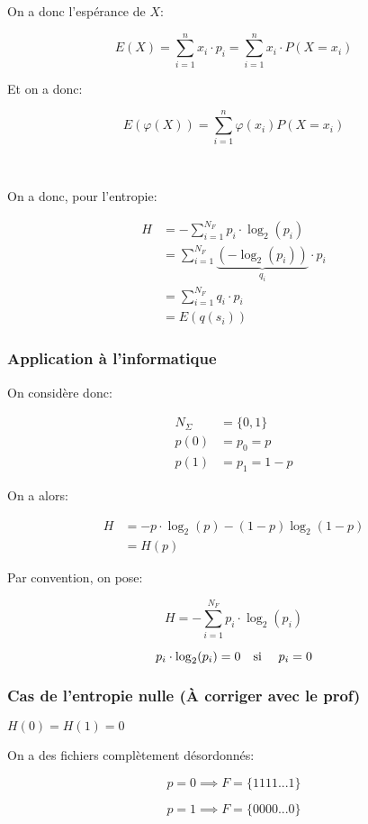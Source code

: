 \documentclass[a4paper,11pt]{article}
\newcommand{\ti}{\cdot}
\begin{document}
On a donc l'espérance de $X$:

$$ E(X) = \sum_{i = 1}^nx_i \ti p_i = \sum_{i = 1}^nx_i \ti P(X = x_i) $$

Et on a donc:

$$ E(\varphi(X)) = \sum_{i = 1}^n \varphi(x_i) P(X = x_i) $$

\

On a donc, pour l'entropie:

\begin{align*}
  H &= - \sum_{i = 1}^{N_F}p_i \ti \log_2(p_i) \\
    &= \sum_{i = 1}^{N_F} \underbrace{(- \log_2(p_i))}_{q_i} \ti p_i \\
    &= \sum_{i = 1}^{N_F} q_i \ti p_i \\
    &= E(q(s_i))
\end{align*}

\subsubsection{Application à l'informatique}

On considère donc:

\begin{align*}
  N_\Sigma &= \{0, 1\} \\
  p(0) &= p_0 = p \\
  p(1) &= p_1 = 1 - p
\end{align*}

On a alors:

\begin{align*}
  H &= -p \ti \log_2(p) - (1 - p) \log_2(1 - p) \\
    &= H(p)
\end{align*}

Par convention, on pose:

$$ H = - \sum_{i = 1}^{N_F}p_i \ti \log_2(p_i) $$

$$ p_i \ti \log_2(p_i) = 0 \text{\quad si \quad} p_i = 0 $$

\subsubsection{Cas de l'entropie nulle (À corriger avec le prof)}

$H(0) = H(1) = 0$

On a des fichiers complètement désordonnés:

$$ p = 0 \implies F = \{1111...1\} $$

$$ p = 1 \implies F = \{0000...0\} $$
\end{document}
